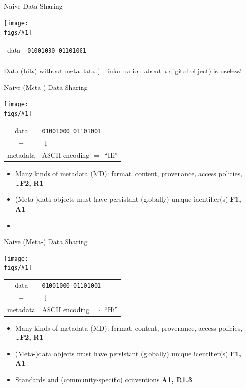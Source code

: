 \documentclass[aspectratio=169,xcolor=dvipsnames]{beamer}
\newcommand{\green}{\color{g3}}
\newcommand{\cyan}{\color{cy}} %
\newcommand{\bi}{\begin{itemize}}
\newcommand{\ei}{\end{itemize}}
\def\figs{figs3}
\begin{document}
\newcommand{\usefig}[3]{
  \begin{center}
  \vspace*{-5mm}
  \texttt{[image: \\figs/\#1]}
  \\
  \hspace*{63mm}
  \begin{tabular}{cl}
    #2 & \tt 01001000 01101001 \hspace*{8em} \\  %
    #3
  \end{tabular}
  \end{center}
}

\begin{frame}{Naive Data Sharing}
  \usefig{use0}{data}{\phantom{meta data} & \phantom{Hi}}

  Data (bits) \alert{without} meta data (= information about a digital object) is \alert{useless!} \\
  \vfill
\end{frame}

\begin{frame}{Naive (Meta-) Data Sharing}
  \begin{center}
    \usefig{use2}{data}{+ & \hspace*{5em} $\downarrow$ \\\cyan metadata & \cyan ASCII encoding $\Rightarrow$ ``Hi''}
  \end{center}

  \bi
  \item Many kinds of {\cyan metadata} (MD): format, content, provenance, access policies, \ldots \hfill {\bf F2, R1}
  \item (Meta-)data objects must have \alert{persistant (globally) unique identifier(s)}  \hfill {\bf F1, A1}
  \item[] 
  \ei
  \vfill
\end{frame}

\begin{frame}{Naive (Meta-) Data Sharing}
  \begin{center}
    \usefig{use3}{data}{+ & \hspace*{5em} $\downarrow$ \\\cyan metadata & \cyan ASCII encoding $\Rightarrow$ ``Hi''}
  \end{center}

  \bi
  \item Many kinds of {\cyan metadata} (MD): format, content, provenance, access policies, \ldots \hfill {\bf F2, R1}
  \item (Meta-)data objects must have \alert{persistant (globally) unique identifier(s)}  \hfill {\bf F1, A1}
  \item {\green Standards} and (community-specific) {\green conventions}  \hfill {\bf A1, R1.3}
  \ei
  \vfill
\end{frame}
\end{document}
